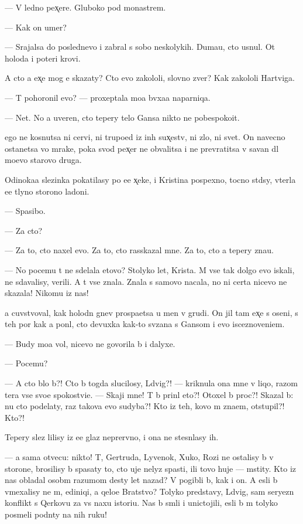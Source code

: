 \documentclass[10pt]{book}
\begin{document}
— V led{\ia}no{\y} pex̨ere. Gluboko pod monast{\yi}rem.

— Kak on umer?

— Srajalsa do poslednevo i zabral s sobo{\y} neskolykih. Duma{\y}u, cto usnul. Ot holoda i poteri krovi.

A cto {\y}a {\y}ex̨e mog {\y}e{\y} skazaty? Cto {\y}evo zakololi, slovno zver{\ia}? Kak zakololi Hartviga.

— T{\yi} pohoronil {\y}evo? — proxeptala mo{\y}a b{\yi}vxa{\y}a naparniqa.

— Net. No {\y}a uveren, cto tepery telo Gansa nikto ne pobespoko{\y}it.

{\Y}ego ne kosnutsa ni cervi, ni trupo{\y}ed{\yi} iz in{\yi}h sux̨estv, ni zlo, ni svet. On navecno ostanetsa vo mrake, poka svod pex̨er{\yi} ne obvalitsa i ne prevratitsa v savan dl{\ia} mo{\y}evo starovo druga.

Odinoka{\y}a slezinka pokatilasy po {\y}e{\y}e x̨eke, i Kristina pospexno, tocno st{\yi}d{\ia}sy, v{\yi}terla {\y}e{\y}e t{\yi}lyno{\y} storono{\y} ladoni.

— Spasibo.

— Za cto?

— Za to, cto naxel {\y}evo. Za to, cto rasskazal mne. Za to, cto {\y}a tepery zna{\y}u.

— No pocemu t{\yi} ne sdelala etovo? Stolyko let, Krista. M{\yi} vse tak dolgo {\y}evo iskali, ne sdavalisy, verili. A t{\yi} vse znala. Znala s samovo nacala, no ni certa nicevo ne skazala! Nikomu iz nas!

{\Y}a cuvstvoval, kak holodn{\yi}{\y} gnev pros{\yi}pa{\y}etsa u men{\ia} v grudi. On jil tam {\y}ex̨e s oseni, s teh por kak {\y}a pon{\ia}l, cto devuxka kak-to sv{\ia}zana s Gansom i {\y}evo isceznoveni{\y}em.

— Budy mo{\y}a vol{\ia}, nicevo ne govorila b{\yi} i dalyxe.

— Pocemu?

— A cto b{\yi}lo b{\yi}?! Cto b{\yi} togda slucilosy, L{\iu}dvig?! — kriknula ona mne v liqo, razom ter{\ia}{\y}a vse svo{\y}e spoko{\y}stvi{\y}e. — Skaji mne! T{\yi} b{\yi} prin{\ia}l eto?! Otoxel b{\yi} proc?! Skazal b{\yi}: nu cto podelaty, raz takova {\y}evo sudyba?! Kto iz teh, kovo m{\yi} zna{\y}em, otstupil?! Kto?!

Tepery slez{\yi} lilisy iz {\y}e{\y}e glaz neprer{\yi}vno, i ona ne stesn{\ia}lasy ih.

— {\Y}a sama otvecu: nikto! T{\yi}, Gertruda, Lyvenok, Xuko, Rozi ne ostalisy b{\yi} v storone, brosilisy b{\yi} spasaty to, cto uje nelyz{\ia} spasti, ili tovo huje — mstity. Kto iz nas obladal osob{\yi}m razumom des{\ia}ty let nazad? V{\yi} pogibli b{\yi}, kak i on. A {\y}esli b{\yi} vmexalisy ne m{\yi}, {\y}ediniqi, a qelo{\y}e Bratstvo? Tolyko predstavy, L{\iu}dvig, sam{\yi}{\y} seryezn{\yi}{\y} konflikt s Qerkov{\y}u za vs{\iu} naxu istori{\y}u. Nas b{\yi} sm{\ia}li i unictojili, {\y}esli b{\yi} m{\yi} tolyko posmeli podn{\ia}ty na nih ruku!
\end{document}
